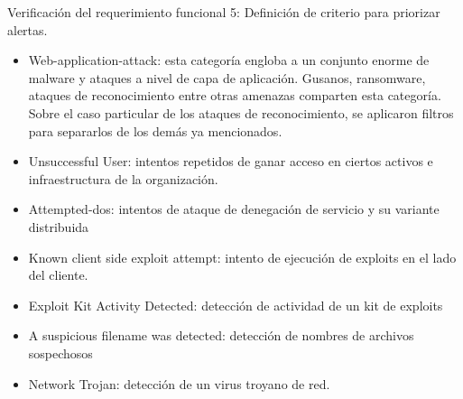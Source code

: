 \begin{section}{Verificación del requerimiento funcional 5: Definición de criterio para priorizar alertas.}
    \begin{itemize}
        \item Web-application-attack: esta categoría engloba a un conjunto enorme de malware y ataques a nivel de capa de aplicación. Gusanos, ransomware, ataques de reconocimiento entre otras amenazas comparten esta categoría. Sobre el caso particular de los ataques de reconocimiento, se aplicaron filtros para separarlos de los demás ya mencionados. 
        \item Unsuccessful User: intentos repetidos de ganar acceso en ciertos activos e infraestructura de la organización.
        \item Attempted-dos: intentos de ataque de denegación de servicio y su variante distribuida
        \item Known client side exploit attempt: intento de ejecución de exploits en el lado del cliente.
        \item Exploit Kit Activity Detected: detección de actividad de un kit de exploits
        \item A suspicious filename was detected: detección de nombres de archivos sospechosos
        \item Network Trojan: detección de un virus troyano de red.
    \end{itemize}
    

\end{section}
